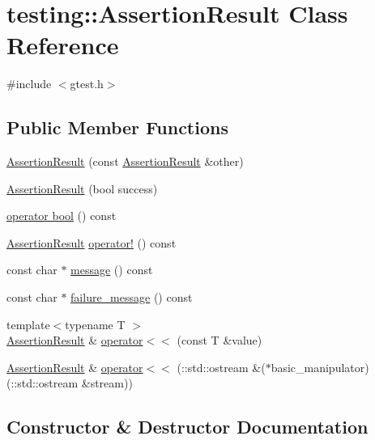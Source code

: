 \hypertarget{classtesting_1_1_assertion_result}{}\section{testing\+:\+:Assertion\+Result Class Reference}
\label{classtesting_1_1_assertion_result}


{\ttfamily \#include $<$gtest.\+h$>$}

\subsection*{Public Member Functions}
\begin{DoxyCompactItemize}
\item 
\hyperlink{classtesting_1_1_assertion_result_a27788116f03f90aec4daf592fd809ead}{Assertion\+Result} (const \hyperlink{classtesting_1_1_assertion_result}{Assertion\+Result} \&other)
\item 
\hyperlink{classtesting_1_1_assertion_result_ade695178c05c4b2f82e92930c912fc25}{Assertion\+Result} (bool success)
\item 
\hyperlink{classtesting_1_1_assertion_result_af85b7852e6399467cd74df539810abcd}{operator bool} () const 
\item 
\hyperlink{classtesting_1_1_assertion_result}{Assertion\+Result} \hyperlink{classtesting_1_1_assertion_result_a85301ba52aa1efe89b79d1e3b59160cd}{operator!} () const 
\item 
const char $\ast$ \hyperlink{classtesting_1_1_assertion_result_ab20c91eba13e20f1b4ad89e3d15f69a8}{message} () const 
\item 
const char $\ast$ \hyperlink{classtesting_1_1_assertion_result_ae54fa82506c507a9dbc0f85d2cec652a}{failure\+\_\+message} () const 
\item 
{\footnotesize template$<$typename T $>$ }\\\hyperlink{classtesting_1_1_assertion_result}{Assertion\+Result} \& \hyperlink{classtesting_1_1_assertion_result_a3230efa81aafe7c61f5fb878cfa39e91}{operator$<$$<$} (const T \&value)
\item 
\hyperlink{classtesting_1_1_assertion_result}{Assertion\+Result} \& \hyperlink{classtesting_1_1_assertion_result_a43ae8a260843ce2ff3dc9af262672b8b}{operator$<$$<$} (\+::std\+::ostream \&($\ast$basic\+\_\+manipulator)(\+::std\+::ostream \&stream))
\end{DoxyCompactItemize}


\subsection{Constructor \& Destructor Documentation}
\hypertarget{classtesting_1_1_assertion_result_a27788116f03f90aec4daf592fd809ead}{}
